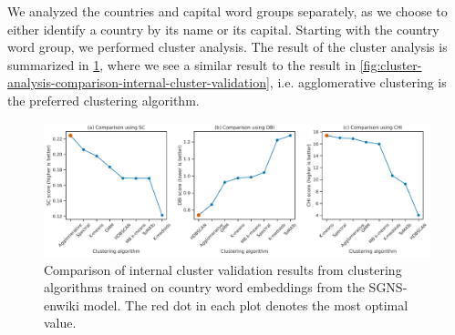 We analyzed the countries and capital word groups separately, as we choose to either identify a country by its name or its capital. Starting with the country word group, we performed cluster analysis. The result of the cluster analysis is summarized in \cref{fig:cluster-analysis-country-word-group-internal-cluster-validation}, where we see a similar result to the result in \cref{fig:cluster-analysis-comparison-internal-cluster-validation}, i.e. agglomerative clustering is the preferred clustering algorithm.
\begin{figure}[H]
    \centering
    \includegraphics[width=\textwidth]{thesis/figures/cluster-analysis-country-word-group-internal-cluster-validation.pdf}
    \caption{Comparison of internal cluster validation results from clustering algorithms trained on country word embeddings from the SGNS-enwiki model. The red dot in each plot denotes the most optimal value.}
    \label{fig:cluster-analysis-country-word-group-internal-cluster-validation}
\end{figure}


